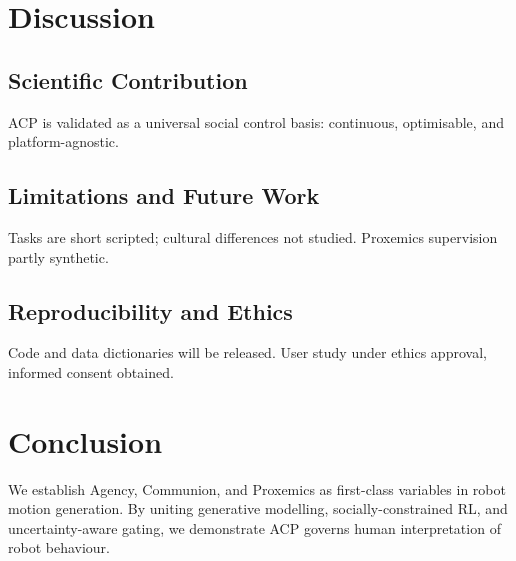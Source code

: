 \documentclass[journal]{IEEEtran}
\begin{document}
\section{Discussion}\label{sec:discussion}

\subsection{Scientific Contribution}
ACP is validated as a universal social control basis: continuous, optimisable, and platform-agnostic.

\subsection{Limitations and Future Work}
Tasks are short scripted; cultural differences not studied. Proxemics supervision partly synthetic.

\subsection{Reproducibility and Ethics}
Code and data dictionaries will be released. User study under ethics approval, informed consent obtained.

\section{Conclusion}\label{sec:conclusion}
We establish Agency, Communion, and Proxemics as first-class variables in robot motion generation. By uniting generative modelling, socially-constrained RL, and uncertainty-aware gating, we demonstrate ACP governs human interpretation of robot behaviour.



\end{document}
